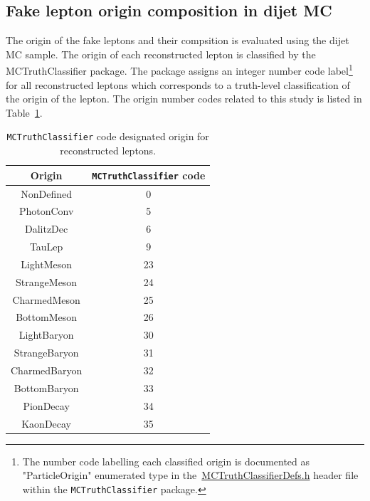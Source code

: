 \subsection{Fake lepton origin composition in dijet MC}
\label{app:boosted_fakelepton_composition}

\newcommand{\OriginFootnote}{%
The number code labelling each classified origin is documented as "ParticleOrigin" enumerated type 
in the~\href{https://svnweb.cern.ch/cern/wsvn/atlasoff/PhysicsAnalysis/MCTruthClassifier/trunk/MCTruthClassifier/MCTruthClassifierDefs.h}
{MCTruthClassifierDefs.h} header file within the \texttt{MCTruthClassifier} package.}

The origin of the fake leptons and their compsition is evaluated using the dijet MC sample. The origin
of each reconstructed lepton is classified by the 
{MCTruthClassifier} package. The package assigns an integer number code label\footnote{\OriginFootnote} for all reconstructed 
leptons which corresponds to a truth-level classification of the origin of the lepton. The origin number codes related to this study is 
listed in Table~\ref{tab:boosted_fakeorigin_origincode}.



\begin{table}[!htbp]
\begin{center}
\begin{tabular}{|c|c|}

Origin        &  \texttt{MCTruthClassifier} code \\
\hline
NonDefined    & 0  \\
PhotonConv    & 5  \\
DalitzDec     & 6  \\
TauLep        & 9  \\
LightMeson    & 23 \\
StrangeMeson  & 24 \\
CharmedMeson  & 25 \\
BottomMeson   & 26 \\
LightBaryon   & 30 \\
StrangeBaryon & 31 \\
CharmedBaryon & 32 \\
BottomBaryon  & 33 \\
PionDecay     & 34 \\
KaonDecay     & 35 \\
\end{tabular}
\end{center}
\caption{\texttt{MCTruthClassifier} code designated origin for reconstructed leptons.}
\label{tab:boosted_fakeorigin_origincode}
\end{table}

